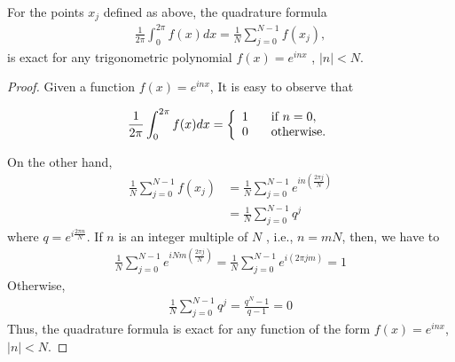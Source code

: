 	\begin{teor}
	\label{Exactness_Even}	
	For the points $x_j$ defined as above, the quadrature formula
    \begin{align*}
         \frac{1}{2\pi}\displaystyle \int^{2\pi}_{0} f(x) dx = \frac{1}{N} \displaystyle \sum^{N-1}_{j=0} f(x_j), 
    \end{align*}
    is exact for any trigonometric polynomial $f(x) = e^{inx}$ , $|n| < N$.
    \end{teor}
	\begin{proof}
	Given a function $f(x) = e^{in x}$, It is easy to observe that
	
    \begin{align*}
        \frac{1}{2\pi}\displaystyle \int^{2\pi}_{0} f(x) dx =  \left \lbrace \begin{array}{ll}
    	1 \hspace{3mm} & \text{if } n = 0, \\
    	0 \hspace{3mm} & \text{otherwise.}
    	\end{array}  \right . 
    \end{align*}

	\noindent On the other hand,    
    \begin{align*}
        \frac{1}{N}  \displaystyle \sum_{j = 0}^{N - 1} f(x_j) &= \frac{1}{N}  \displaystyle \sum_{j = 0}^{N - 1} e^{in (\frac{2\pi j}{N})} \\
        &= \frac{1}{N}  \displaystyle \sum_{j = 0}^{N - 1} q^j
    \end{align*}
    where $q = e^{i \frac{2\pi n}{N}}$. If $n$ is an integer multiple of $N$ , i.e., $n = m N$, then, we have to
    \begin{align*}
    	\displaystyle \frac{1}{N} \sum^{N-1}_{j=0}  e^{i Nm (\frac{2\pi j}{N})} = \frac{1}{N} \sum^{N-1}_{j=0}  e^{i(2\pi j m)} = 1
    \end{align*} 
	Otherwise, 
	\begin{align*}
		\displaystyle \frac{1}{N} \sum^{N-1}_{j=0} q^j = \frac{q^{N} - 1}{q - 1} = 0
	\end{align*}
	Thus, the quadrature formula is exact for any function of the form $f(x) = e^{inx}$, $|n| < N$.
	\end{proof}

